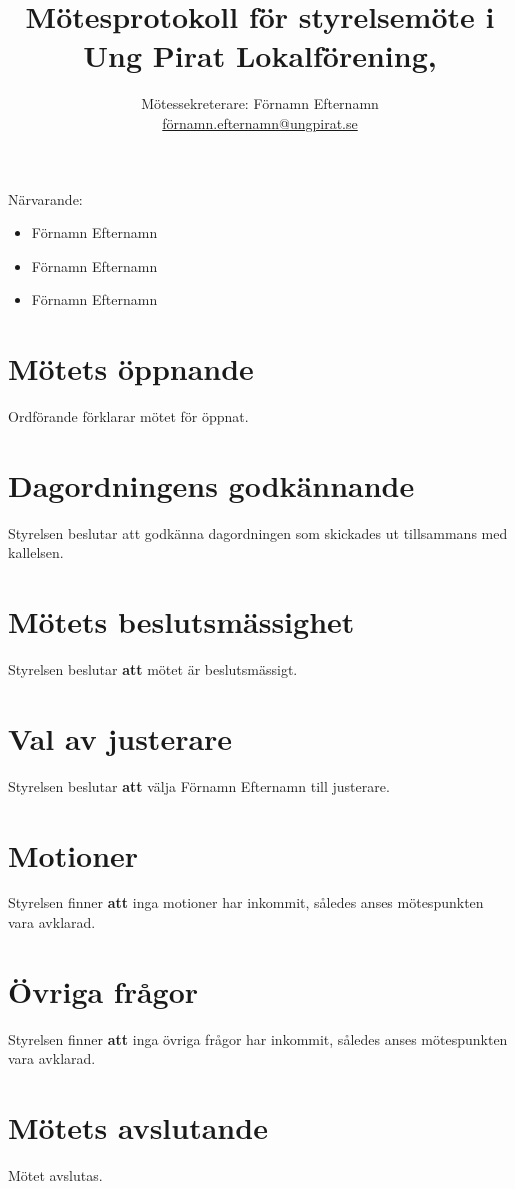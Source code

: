 \documentclass[a4paper,10pt]{article}	%
\title{Mötesprotokoll för styrelsemöte i Ung Pirat Lokalförening,}
\author{Mötessekreterare: Förnamn Efternamn\\
  \url{förnamn.efternamn@ungpirat.se}}
\newcommand\verabd[1]{{\usefont{T1}{verabd}{m}{n} #1 }}
\begin{document}
\maketitle

\newpage

Närvarande:
\begin{itemize}
\item Förnamn Efternamn
\item Förnamn Efternamn
\item Förnamn Efternamn
\end{itemize}

\section{Mötets öppnande}
Ordförande förklarar mötet för öppnat.

\section{Dagordningens godkännande}
Styrelsen beslutar \verabd{att} godkänna dagordningen som skickades ut tillsammans med kallelsen.

\section{Mötets beslutsmässighet}
Styrelsen beslutar \textbf{att} mötet är beslutsmässigt.

\section{Val av justerare}
Styrelsen beslutar \textbf{att} välja Förnamn Efternamn till justerare.

\section{Motioner}
Styrelsen finner \textbf{att} inga motioner har inkommit, således anses mötespunkten vara avklarad.

\section{Övriga frågor}
Styrelsen finner \textbf{att} inga övriga frågor har inkommit, således anses mötespunkten vara avklarad.

\section{Mötets avslutande}
Mötet avslutas.
\end{document}
